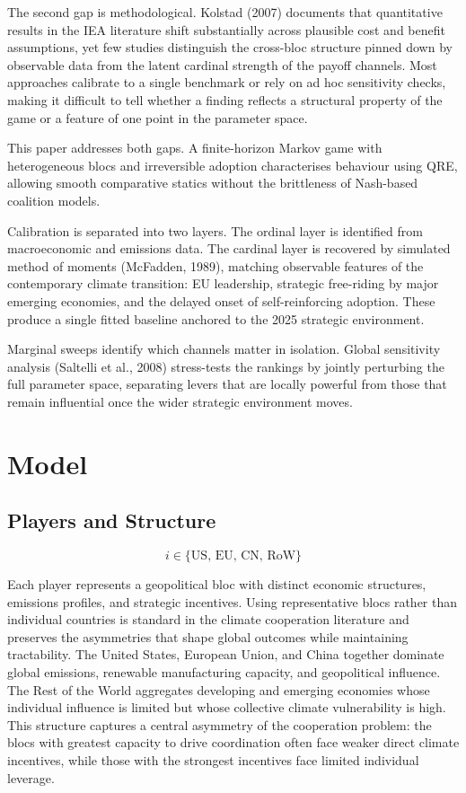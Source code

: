 \documentclass[10pt,a4paper]{article}
\begin{document}
The second gap is methodological. Kolstad (2007) documents that quantitative results in the IEA literature shift substantially across plausible cost and benefit assumptions, yet few studies distinguish the cross-bloc structure pinned down by observable data from the latent cardinal strength of the payoff channels. Most approaches calibrate to a single benchmark or rely on ad hoc sensitivity checks, making it difficult to tell whether a finding reflects a structural property of the game or a feature of one point in the parameter space.

This paper addresses both gaps. A finite-horizon Markov game with heterogeneous blocs and irreversible adoption characterises behaviour using QRE, allowing smooth comparative statics without the brittleness of Nash-based coalition models.

Calibration is separated into two layers. The ordinal layer is identified from macroeconomic and emissions data. The cardinal layer is recovered by simulated method of moments (McFadden, 1989), matching observable features of the contemporary climate transition: EU leadership, strategic free-riding by major emerging economies, and the delayed onset of self-reinforcing adoption. These produce a single fitted baseline anchored to the 2025 strategic environment.

Marginal sweeps identify which channels matter in isolation. Global sensitivity analysis (Saltelli et al., 2008) stress-tests the rankings by jointly perturbing the full parameter space, separating levers that are locally powerful from those that remain influential once the wider strategic environment moves.

\clearpage
\needspace{12em}
\section{Model}

\needspace{12em}
\subsection*{Players and Structure}

\[
i \in \{\text{US, EU, CN, RoW}\}
\]

Each player represents a geopolitical bloc with distinct economic structures, emissions profiles,
and strategic incentives. Using representative blocs rather than individual countries is standard
in the climate cooperation literature and preserves the asymmetries that shape global outcomes
while maintaining tractability. The United States, European Union, and China together dominate
global emissions, renewable manufacturing capacity, and geopolitical influence. The Rest of
the World aggregates developing and emerging economies whose individual influence is limited
but whose collective climate vulnerability is high. This structure captures a central asymmetry
of the cooperation problem: the blocs with greatest capacity to drive coordination often face
weaker direct climate incentives, while those with the strongest incentives face limited individual
leverage.
\end{document}
